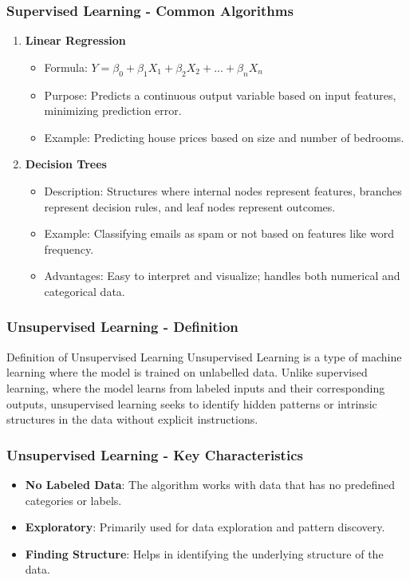 \documentclass[aspectratio=169]{beamer}
\begin{document}
\begin{frame}[fragile]
    \frametitle{Supervised Learning - Common Algorithms}
    \begin{enumerate}
        \item \textbf{Linear Regression}
        \begin{itemize}
            \item Formula: \( Y = \beta_0 + \beta_1X_1 + \beta_2X_2 + ... + \beta_nX_n \)
            \item Purpose: Predicts a continuous output variable based on input features, minimizing prediction error.
            \item Example: Predicting house prices based on size and number of bedrooms.
        \end{itemize}
        \item \textbf{Decision Trees}
        \begin{itemize}
            \item Description: Structures where internal nodes represent features, branches represent decision rules, and leaf nodes represent outcomes.
            \item Example: Classifying emails as spam or not based on features like word frequency.
            \item Advantages: Easy to interpret and visualize; handles both numerical and categorical data.
        \end{itemize}
    \end{enumerate}
\end{frame}

\begin{frame}[fragile]
  \frametitle{Unsupervised Learning - Definition}
  \begin{block}{Definition of Unsupervised Learning}
    Unsupervised Learning is a type of machine learning where the model is trained on unlabelled data. Unlike supervised learning, where the model learns from labeled inputs and their corresponding outputs, unsupervised learning seeks to identify hidden patterns or intrinsic structures in the data without explicit instructions.
  \end{block}
\end{frame}

\begin{frame}[fragile]
  \frametitle{Unsupervised Learning - Key Characteristics}
  \begin{itemize}
    \item \textbf{No Labeled Data}: The algorithm works with data that has no predefined categories or labels.
    \item \textbf{Exploratory}: Primarily used for data exploration and pattern discovery.
    \item \textbf{Finding Structure}: Helps in identifying the underlying structure of the data.
  \end{itemize}
\end{frame}
\end{document}
